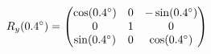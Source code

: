 \documentclass[preview]{standalone}
\begin{document}
\begin{align*}
\special{dvisvgm:raw <g id='unique000'>}R_y(0.4^\circ) = \begin{pmatrix} \cos(0.4^\circ) & 0 & -\sin(0.4^\circ) \\ 0 & 1 & 0 \\ \sin(0.4^\circ) & 0 & \cos(0.4^\circ) \end{pmatrix}\special{dvisvgm:raw </g>}
\end{align*}
\end{document}
